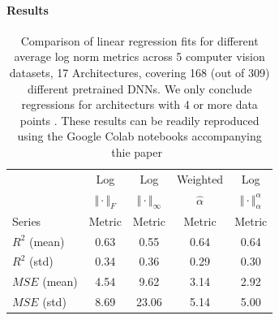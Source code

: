 \paragraph{Results}
\begin{table}[t]
\small
\begin{center}
\begin{tabular}{|p{0.75in}|c|c|c|c|}
\hline
        & Log                   & Log                        & Weighted       & Log                                 \\
        & $\Vert\cdot\Vert_{F}$ & $\Vert\cdot\Vert_{\infty}$ & $\hat{\alpha}$ & $\Vert\cdot\Vert^{\alpha}_{\alpha}$ \\
 Series & Metric                & Metric                     & Metric         & Metric                              \\
\hline
$R^{2}$ (mean) & 0.63 &0.55 &0.64 &0.64 \\
$R^{2}$ (std)  & 0.34 &0.36 &0.29 &0.30 \\
\hline
$MSE$ (mean)   & 4.54 &9.62 &3.14 &2.92 \\
$MSE$ (std)    & 8.69 &23.06 &5.14 &5.00 \\
\hline
\end{tabular}
\end{center}
\caption{Comparison of linear regression fits for different average log norm metrics across 5 computer vision datasets, 17 Architectures, covering 168 (out of 309) different pretrained DNNs.  We only conclude regressions for architecturs with 4 or more data points .  These results can be readily reproduced using the Google Colab notebooks accompanying thie paper~\cite{notebooks}}
\label{table:results}
\end{table}


